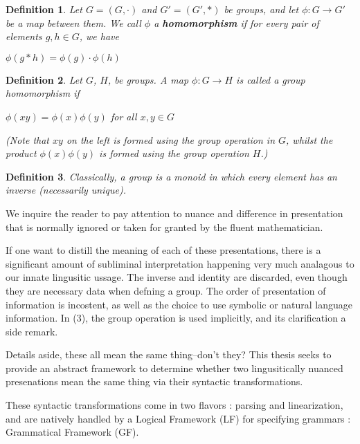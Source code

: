 \documentclass[11pt, a4paper]{article}
\newtheorem{definition}{Definition} \newtheorem{lem}{Lemma}
\begin{document}

\begin{definition} Let $G = (G,\cdot)$ and $G' = (G',\ast)$ be groups, and let
$\phi : G \to G'$ be a map between them. We call $\phi$ a \textbf{homomorphism}
if for every pair of elements $g, h \in G$, we have
\begin{center} $\phi(g \ast h) = \phi ( g ) \cdot \phi ( h )$
\end{center}
\end{definition}


\begin{definition} Let $G$, $H$, be groups. A map $\phi : G \to H$ is called a
\emph{group homomorphism} if
\begin{center} $\phi(xy) = \phi ( x ) \phi ( y )$ for all $x, y \in G$
\end{center} (Note that $xy$ on the left is formed using the group operation in
$G$, whilst the product $\phi ( x ) \phi ( y )$ is formed using the group
operation $H$.)
\end{definition}


\begin{definition} Classically, a group is a monoid in which every element has
an inverse (necessarily unique).
\end{definition}

We inquire the reader to pay attention to nuance and difference in presentation
that is normally ignored or taken for granted by the fluent mathematician.

If one want to distill the meaning of each of these presentations, there is a
significant amount of subliminal interpretation happening very much analagous to
our innate lingusitic ussage. The inverse and identity are discarded, even
though they are necessary data when defning a group. The order of presentation
of information is incostent, as well as the choice to use symbolic or natural
language information. In (3), the group operation is used implicitly, and its
clarification a side remark.

Details aside, these all mean the same thing--don't they? This thesis seeks to
provide an abstract framework to determine whether two lingusitically nuanced
presenations mean the same thing via their syntactic transformations.

These syntactic transformations come in two flavors : parsing and linearization,
and are natively handled by a Logical Framework (LF) for specifying grammars :
Grammatical Framework (GF).
\end{document}
